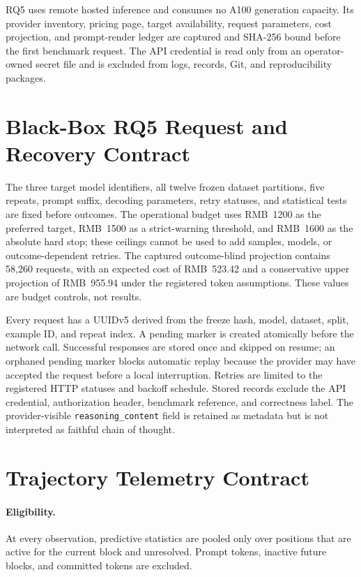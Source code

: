 \ComputeBudgetAppendixTable

RQ5 uses remote hosted inference and consumes no A100 generation capacity. Its
provider inventory, pricing page, target availability, request parameters,
cost projection, and prompt-render ledger are captured and SHA-256 bound before
the first benchmark request. The API credential is read only from an
operator-owned secret file and is excluded from logs, records, Git, and
reproducibility packages.

\section{Black-Box RQ5 Request and Recovery Contract}

The three target model identifiers, all twelve frozen dataset partitions, five
repeats, prompt suffix, decoding parameters, retry statuses, and statistical
tests are fixed before outcomes. The operational budget uses RMB~1200 as the
preferred target, RMB~1500 as a strict-warning threshold, and RMB~1600 as the
absolute hard stop; these ceilings cannot be used to add samples, models, or
outcome-dependent retries. The captured
outcome-blind projection contains 58,260 requests, with an expected cost of
RMB~523.42 and a conservative upper projection of RMB~955.94 under the
registered token assumptions. These values are budget controls, not results.

Every request has a UUIDv5 derived from the freeze hash, model, dataset, split,
example ID, and repeat index. A pending marker is created atomically before the
network call. Successful responses are stored once and skipped on resume; an
orphaned pending marker blocks automatic replay because the provider may have
accepted the request before a local interruption. Retries are limited to the
registered HTTP statuses and backoff schedule. Stored records exclude the API
credential, authorization header, benchmark reference, and correctness label.
The provider-visible \texttt{reasoning\_content} field is retained as metadata
but is not interpreted as faithful chain of thought.

\section{Trajectory Telemetry Contract}

\paragraph{Eligibility.}
At every observation, predictive statistics are pooled only over positions that are active for the current block and unresolved.
Prompt tokens, inactive future blocks, and committed tokens are excluded.

